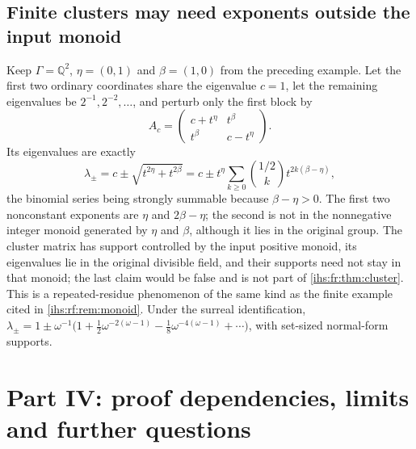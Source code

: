 \documentclass[11pt,a4paper]{article}
\numberwithin{equation}{section}
\theoremstyle{definition}
\theoremstyle{remark}
\newcommand{\Q}{\mathbb Q}
\begin{document}
\subsection{Finite clusters may need exponents outside the input monoid}\label{ihs:fr:sec:monoid}
Keep $\Gamma=\Q^2$, $\eta=(0,1)$ and $\beta=(1,0)$ from the preceding
example. Let the first two ordinary coordinates share the eigenvalue $c=1$, let the
remaining eigenvalues be $2^{-1},2^{-2},\ldots$, and perturb only the first
block by
\begin{equation}\label{ihs:fr:eq:twoscaleblock}
 A_c=\begin{pmatrix}c+t^\eta&t^\beta\\t^\beta&c-t^\eta\end{pmatrix}.
\end{equation}
Its eigenvalues are exactly
\begin{equation}\label{ihs:fr:eq:twoscaleeigen}
 \lambda_\pm=c\pm\sqrt{t^{2\eta}+t^{2\beta}}
 =c\pm t^\eta\sum_{k\ge0}\binom{1/2}{k}t^{2k(\beta-\eta)},
\end{equation}
the binomial series being strongly summable because $\beta-\eta>0$. The
first two nonconstant exponents are $\eta$ and $2\beta-\eta$; the second is
not in the nonnegative integer monoid generated by $\eta$ and $\beta$,
although it lies in the original group. The cluster matrix has support
controlled by the input positive monoid, its eigenvalues lie in the original
divisible field, and their supports need not stay in that monoid; the last
claim would be false and is not part of \cref{ihs:fr:thm:cluster}. This is a
repeated-residue phenomenon of the same kind as the finite example cited in
\cref{ihs:rf:rem:monoid}. Under the surreal identification,
$\lambda_\pm=1\pm\omega^{-1}\bigl(1+\tfrac12\omega^{-2(\omega-1)}
-\tfrac18\omega^{-4(\omega-1)}+\cdots\bigr)$, with set-sized normal-form
supports.

\section{Part IV: proof dependencies, limits and further questions}\label{ihs:fr:sec:limits}
\end{document}
